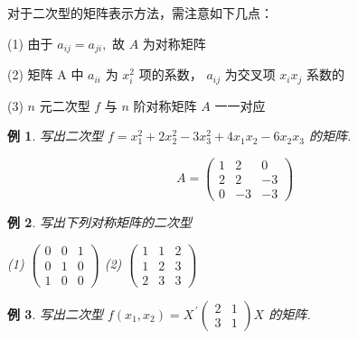 \documentclass[13pt]{beamer}
\newtheorem{exa}{例}
\begin{document}
\begin{frame}
对于二次型的矩阵表示方法，需注意如下几点：

(1) 由于 $a_{i j}=a_{j i},$ 故 $A$ 为对称矩阵

(2) 矩阵 A 中 $a_{i i}$ 为 $x_{i}^{2}$ 项的系数， $a_{i j}$ 为交叉项 $x_{i} x_{j}$ 系数的

(3) $n$ 元二次型 $f$ 与  $n$ 阶\alert{对称矩阵} $A$ 一一对应

\begin{exa}
	写出二次型 $f=x_{1}^{2}+2 x_{2}^{2}-3 x_{3}^{2}+4 x_{1} x_{2}-6 x_{2} x_{3}$
	的矩阵.
\end{exa}
\pause
%

$$ A=\left(\begin{array}{ccc}1 & 2 & 0 \\ 2 & 2 & -3 \\ 0 & -3 & -3\end{array}\right)$$


\end{frame}

\begin{frame}
\begin{exa}
写出下列对称矩阵的二次型

(1) $\left(\begin{array}{lll}0 & 0 & 1 \\ 0 & 1 & 0 \\ 1 & 0 & 0\end{array}\right)$
(2) $\left(\begin{array}{lll}1 & 1 & 2 \\ 1 & 2 & 3 \\ 2 & 3 & 3\end{array}\right)$
\end{exa}

\begin{exa}
写出二次型 $f\left(x_{1}, x_{2}\right)=X^{\,\prime}\left(\begin{array}{cc}2 & 1 \\ 3 & 1\end{array}\right) X$ 的矩阵. 
\end{exa}
\end{frame}
\end{document}

